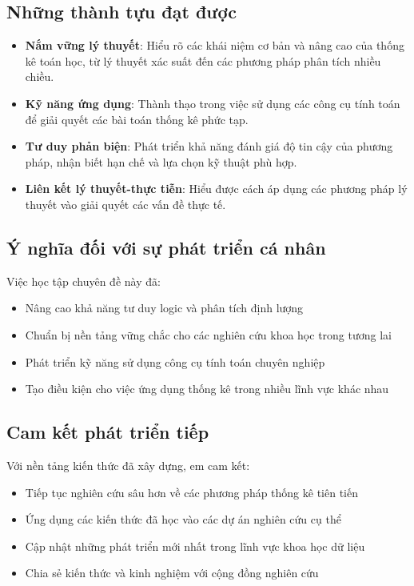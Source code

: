 \subsection*{Những thành tựu đạt được}

\begin{itemize}
    \item \textbf{Nắm vững lý thuyết}: Hiểu rõ các khái niệm cơ bản và nâng cao của thống kê toán học, từ lý thuyết xác suất đến các phương pháp phân tích nhiều chiều.
    
    \item \textbf{Kỹ năng ứng dụng}: Thành thạo trong việc sử dụng các công cụ tính toán để giải quyết các bài toán thống kê phức tạp.
    
    \item \textbf{Tư duy phản biện}: Phát triển khả năng đánh giá độ tin cậy của phương pháp, nhận biết hạn chế và lựa chọn kỹ thuật phù hợp.
    
    \item \textbf{Liên kết lý thuyết-thực tiễn}: Hiểu được cách áp dụng các phương pháp lý thuyết vào giải quyết các vấn đề thực tế.
\end{itemize}

\subsection*{Ý nghĩa đối với sự phát triển cá nhân}

Việc học tập chuyên đề này đã:

\begin{itemize}
    \item Nâng cao khả năng tư duy logic và phân tích định lượng
    \item Chuẩn bị nền tảng vững chắc cho các nghiên cứu khoa học trong tương lai
    \item Phát triển kỹ năng sử dụng công cụ tính toán chuyên nghiệp
    \item Tạo điều kiện cho việc ứng dụng thống kê trong nhiều lĩnh vực khác nhau
\end{itemize}

\subsection*{Cam kết phát triển tiếp}

Với nền tảng kiến thức đã xây dựng, em cam kết:

\begin{itemize}
    \item Tiếp tục nghiên cứu sâu hơn về các phương pháp thống kê tiên tiến
    \item Ứng dụng các kiến thức đã học vào các dự án nghiên cứu cụ thể
    \item Cập nhật những phát triển mới nhất trong lĩnh vực khoa học dữ liệu
    \item Chia sẻ kiến thức và kinh nghiệm với cộng đồng nghiên cứu
\end{itemize}

